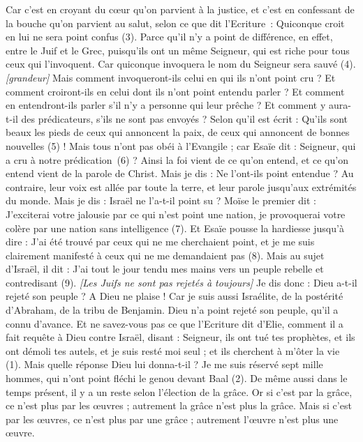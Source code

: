 \begin{multicols}{2}
Car c’est en croyant du cœur qu’on parvient à la justice, et c’est en confessant de la bouche qu’on parvient au salut, selon ce que dit l’Ecriture :
Quiconque croit en lui ne sera point confus (3).
Parce qu'il n'y a point de différence, en effet, entre le Juif et le Grec, puisqu’ils ont un même Seigneur, qui est riche pour tous ceux qui l'invoquent.
Car quiconque invoquera le nom du Seigneur sera sauvé (4).
\textit{[grandeur]}
Mais comment invoqueront-ils celui en qui ils n'ont point cru ? Et comment croiront-ils en celui dont ils n'ont point entendu parler ? Et comment en entendront-ils parler s'il n'y a personne qui leur prêche ?
Et comment y aura-t-il des prédicateurs, s’ils ne sont pas envoyés ? Selon qu'il est écrit : Qu’ils sont beaux les pieds de ceux qui annoncent la paix, de ceux qui annoncent de bonnes nouvelles (5) !
Mais tous n'ont pas obéi à l'Evangile ; car Esaïe dit : Seigneur, qui a cru à notre prédication (6) ?
Ainsi la foi vient de ce qu’on entend, et ce qu’on entend vient de la parole de Christ.
Mais je dis : Ne l'ont-ils point entendue ? Au contraire, leur voix est allée par toute la terre, et leur parole jusqu’aux extrémités du monde.
Mais je dis : Israël ne l'a-t-il point su ? Moïse le premier dit : J’exciterai votre jalousie par ce qui n'est point une nation, je provoquerai votre colère par une nation sans intelligence (7).
Et Esaïe pousse la hardiesse jusqu’à dire : J'ai été trouvé par ceux qui ne me cherchaient point, et je me suis clairement manifesté à ceux qui ne me demandaient pas (8).
Mais au sujet d’Israël, il dit : J'ai tout le jour tendu mes mains vers un peuple rebelle et contredisant (9).
\textit{[Les Juifs ne sont pas rejetés à toujours]}
\VerseOne{}Je dis donc : Dieu a-t-il rejeté son peuple ? A Dieu ne plaise ! Car je suis aussi Israélite, de la postérité d'Abraham, de la tribu de Benjamin.
Dieu n'a point rejeté son peuple, qu’il a connu d’avance. Et ne savez-vous pas ce que l'Ecriture dit d'Elie, comment il a fait requête à Dieu contre Israël, disant :
Seigneur, ils ont tué tes prophètes, et ils ont démoli tes autels, et je suis resté moi seul ; et ils cherchent à m'ôter la vie (1).
Mais quelle réponse Dieu lui donna-t-il ? Je me suis réservé sept mille hommes, qui n'ont point fléchi le genou devant Baal (2).
De même aussi dans le temps présent, il y a un reste selon l'élection de la grâce.
Or si c'est par la grâce, ce n'est plus par les œuvres ; autrement la grâce n'est plus la grâce. Mais si c'est par les œuvres, ce n'est plus par une grâce ; autrement l’œuvre n'est plus une œuvre.

\end{multicols}
